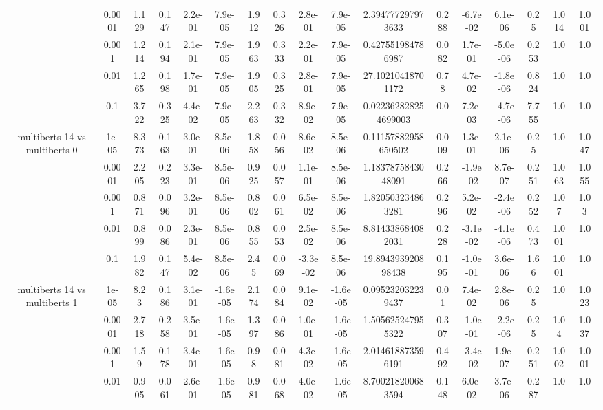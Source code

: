 \begin{tabular}{|c|c|c|c|c|c|c|c|c|c|c|c|c|c|c|c|c|}
 & 0.0001 & 1.129 & 0.147 & 2.2e-01 & 7.9e-05 & 1.912 & 0.326 & 2.8e-01 & 7.9e-05 & 2.394777297973633 & 0.288 & -6.7e-02 & 6.1e-06 & 0.25 & 1.014 & 1.001 \\
 & 0.001 & 1.214 & 0.194 & 2.1e-01 & 7.9e-05 & 1.963 & 0.333 & 2.2e-01 & 7.9e-05 & 0.427551984786987 & 0.082 & 1.7e-01 & -5.0e-06 & 0.253 & 1.0 & 1.0 \\
 & 0.01 & 1.265 & 0.198 & 1.7e-01 & 7.9e-05 & 1.905 & 0.325 & 2.8e-01 & 7.9e-05 & 27.10210418701172 & 0.78 & 4.7e-02 & -1.8e-06 & 0.824 & 1.0 & 1.0 \\
 & 0.1 & 3.722 & 0.325 & 4.4e-02 & 7.9e-05 & 2.263 & 0.332 & 8.9e-02 & 7.9e-05 & 0.022362828254699003 & 0.0 & 7.2e-03 & -4.7e-06 & 7.755 & 1.0 & 1.0 \\
\hline
\multirow{5}{*}{multiberts 14 vs multiberts 0} & 1e-05 & 8.373 & 0.163 & 3.0e-01 & 8.5e-06 & 1.858 & 0.056 & 8.6e-02 & 8.5e-06 & 0.11157882958650502 & 0.009 & 1.3e-01 & 2.1e-06 & 0.25 & 1.0 & 1.047 \\
 & 0.0001 & 2.205 & 0.223 & 3.3e-01 & 8.5e-06 & 0.925 & 0.057 & 1.1e-01 & 8.5e-06 & 1.1837875843048091 & 0.266 & -1.9e-02 & 8.7e-07 & 0.251 & 1.063 & 1.055 \\
 & 0.001 & 0.871 & 0.096 & 3.2e-01 & 8.5e-06 & 0.802 & 0.061 & 6.5e-02 & 8.5e-06 & 1.820503234863281 & 0.296 & 5.2e-02 & -2.4e-06 & 0.252 & 1.07 & 1.03 \\
 & 0.01 & 0.899 & 0.086 & 2.3e-01 & 8.5e-06 & 0.855 & 0.053 & 2.5e-02 & 8.5e-06 & 8.814338684082031 & 0.228 & -3.1e-02 & -4.1e-06 & 0.473 & 1.001 & 1.0 \\
 & 0.1 & 1.982 & 0.147 & 5.4e-02 & 8.5e-06 & 2.45 & 0.069 & -3.3e-02 & 8.5e-06 & 19.894393920898438 & 0.195 & -1.0e-01 & 3.6e-06 & 1.66 & 1.001 & 1.0 \\
\hline
\multirow{5}{*}{multiberts 14 vs multiberts 1} & 1e-05 & 8.23 & 0.186 & 3.1e-01 & -1.6e-05 & 2.174 & 0.084 & 9.1e-02 & -1.6e-05 & 0.095232032239437 & 0.01 & 7.4e-02 & 2.8e-06 & 0.25 & 1.0 & 1.023 \\
 & 0.0001 & 2.718 & 0.258 & 3.5e-01 & -1.6e-05 & 1.397 & 0.086 & 1.0e-01 & -1.6e-05 & 1.505625247955322 & 0.307 & -1.0e-01 & -2.2e-06 & 0.25 & 1.04 & 1.037 \\
 & 0.001 & 1.59 & 0.178 & 3.4e-01 & -1.6e-05 & 0.98 & 0.081 & 4.3e-02 & -1.6e-05 & 2.014618873596191 & 0.492 & -3.4e-02 & 1.9e-07 & 0.251 & 1.002 & 1.001 \\
 & 0.01 & 0.905 & 0.061 & 2.6e-01 & -1.6e-05 & 0.981 & 0.068 & 4.0e-02 & -1.6e-05 & 8.700218200683594 & 0.148 & 6.0e-02 & 3.7e-06 & 0.287 & 1.0 & 1.0 \\

\end{tabular}
